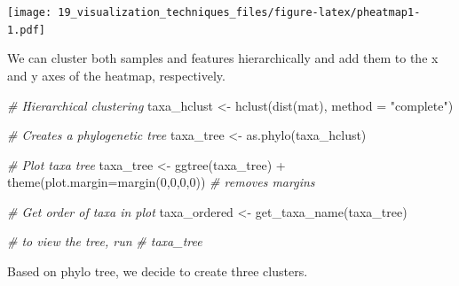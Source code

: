 \documentclass[
]{book}
\newenvironment{Shaded}{\begin{snugshade}}{\end{snugshade}}
\newcommand{\AttributeTok}[1]{\textcolor[rgb]{0.77,0.63,0.00}{#1}}
\newcommand{\CommentTok}[1]{\textcolor[rgb]{0.56,0.35,0.01}{\textit{#1}}}
\newcommand{\ConstantTok}[1]{\textcolor[rgb]{0.00,0.00,0.00}{#1}}
\newcommand{\DecValTok}[1]{\textcolor[rgb]{0.00,0.00,0.81}{#1}}
\newcommand{\FunctionTok}[1]{\textcolor[rgb]{0.00,0.00,0.00}{#1}}
\newcommand{\NormalTok}[1]{#1}
\newcommand{\OtherTok}[1]{\textcolor[rgb]{0.56,0.35,0.01}{#1}}
\newcommand{\SpecialCharTok}[1]{\textcolor[rgb]{0.00,0.00,0.00}{#1}}
\newcommand{\StringTok}[1]{\textcolor[rgb]{0.31,0.60,0.02}{#1}}
\begin{document}
\texttt{[image: 19\_visualization\_techniques\_files/figure-latex/pheatmap1-1.pdf]}

We can cluster both samples and features hierarchically and add them to the
x and y axes of the heatmap, respectively.

\begin{Shaded}
\begin{Highlighting}[]
\CommentTok{\# Hierarchical clustering}
\NormalTok{taxa\_hclust }\OtherTok{\textless{}{-}} \FunctionTok{hclust}\NormalTok{(}\FunctionTok{dist}\NormalTok{(mat), }\AttributeTok{method =} \StringTok{"complete"}\NormalTok{)}

\CommentTok{\# Creates a phylogenetic tree}
\NormalTok{taxa\_tree }\OtherTok{\textless{}{-}} \FunctionTok{as.phylo}\NormalTok{(taxa\_hclust)}

\CommentTok{\# Plot taxa tree}
\NormalTok{taxa\_tree }\OtherTok{\textless{}{-}} \FunctionTok{ggtree}\NormalTok{(taxa\_tree) }\SpecialCharTok{+} 
  \FunctionTok{theme}\NormalTok{(}\AttributeTok{plot.margin=}\FunctionTok{margin}\NormalTok{(}\DecValTok{0}\NormalTok{,}\DecValTok{0}\NormalTok{,}\DecValTok{0}\NormalTok{,}\DecValTok{0}\NormalTok{)) }\CommentTok{\# removes margins}

\CommentTok{\# Get order of taxa in plot}
\NormalTok{taxa\_ordered }\OtherTok{\textless{}{-}} \FunctionTok{get\_taxa\_name}\NormalTok{(taxa\_tree)}

\CommentTok{\# to view the tree, run}
\CommentTok{\# taxa\_tree}
\end{Highlighting}
\end{Shaded}

Based on phylo tree, we decide to create three clusters.

\begin{Shaded}
\end{Shaded}
\end{document}
